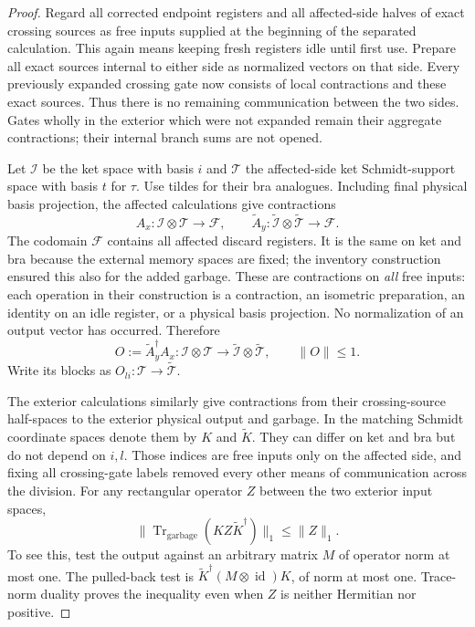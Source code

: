 \documentclass[11pt]{article}
\numberwithin{equation}{section}
\theoremstyle{definition}
\theoremstyle{remark}
\DeclareMathOperator{\Tr}{Tr}
\DeclareMathOperator{\id}{id}
\newcommand{\norm}[1]{\lVert #1\rVert}
\begin{document}
\begin{proof}
Regard all corrected endpoint registers and all affected-side halves of
exact crossing sources as free inputs supplied at the beginning of the
separated calculation.  This again means keeping fresh registers idle
until first use.  Prepare all exact sources internal to either side as
normalized vectors on that side.  Every previously expanded crossing
gate now consists of local contractions and these exact sources.  Thus
there is no remaining communication between the two sides.  Gates
wholly in the exterior which were not expanded remain their aggregate
contractions; their internal branch sums are not opened.

Let $\mathcal I$ be the ket space with basis $i$ and $\mathcal T$ the
affected-side ket Schmidt-support space with basis $t$ for $\tau$.
Use tildes for their bra analogues.  Including final physical basis
projection, the affected calculations give contractions
\[
 A_x:\mathcal I\otimes\mathcal T\longrightarrow\mathcal F,
 \qquad
 \widetilde A_y:\widetilde{\mathcal I}\otimes
              \widetilde{\mathcal T}\longrightarrow\mathcal F.
\]
The codomain $\mathcal F$ contains all affected discard registers.  It
is the same on ket and bra because the external memory spaces are fixed;
the inventory construction ensured this also for the added garbage.
These are contractions on \emph{all} free inputs: each operation in
their construction is a contraction, an isometric preparation, an
identity on an idle register, or a physical basis projection.  No
normalization of an output vector has occurred.  Therefore
\begin{equation}
 O:=\widetilde A_y^\dagger A_x:
       \mathcal I\otimes\mathcal T\longrightarrow
       \widetilde{\mathcal I}\otimes\widetilde{\mathcal T},
 \qquad \norm{O}\le1.
 \label{eq:compression-block-contraction}
\end{equation}
Write its blocks as $O_{li}:\mathcal T\to\widetilde{\mathcal T}$.

The exterior calculations similarly give contractions from their
crossing-source half-spaces to the exterior physical output and
garbage.  In the matching Schmidt coordinate spaces denote them by
$K$ and $\widetilde K$.  They can differ on ket and bra but do not
depend on $i,l$.  Those indices are free inputs only on the affected
side, and fixing all crossing-gate labels removed every other means
of communication across the division.  For any rectangular operator
$Z$ between the two exterior input spaces,
\begin{equation}
 \norm{\Tr_{\mathrm{garbage}}(KZ\widetilde K^\dagger)}_1
          \le\norm{Z}_1.
 \label{eq:compression-exterior-contraction}
\end{equation}
To see this, test the output against an arbitrary matrix $M$ of operator
norm at most one.  The pulled-back test is
$\widetilde K^\dagger(M\otimes\id)K$, of norm at most one.
Trace-norm duality proves the inequality even when $Z$ is neither
Hermitian nor positive.


\end{proof}
\end{document}
